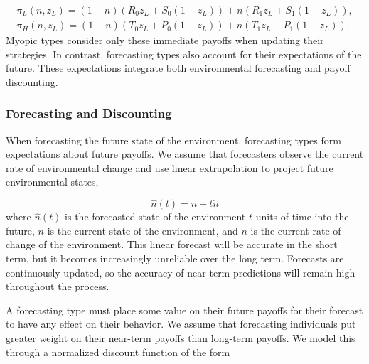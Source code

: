 \documentclass{article}
\begin{document}
\begin{align}
        \pi_L(n,z_L)= (1-n)(R_0 z_L +S_0 (1-z_L)) + n(R_1 z_L + S_1 (1-z_L)), \\
        \pi_H(n,z_L)= (1-n)(T_0 z_L +P_0 (1-z_L)) + n(T_1 z_L + P_1 (1-z_L)). 
\end{align}
Myopic types consider only these immediate payoffs when updating their strategies. In contrast, forecasting types also account for their expectations of the future. These expectations integrate both environmental forecasting and payoff discounting.

\subsubsection*{Forecasting and Discounting}
When forecasting the future state of the environment, forecasting types form expectations about future payoffs.  We assume that forecasters observe the current rate of environmental change and use linear extrapolation to project future environmental states, 

\begin{equation}
    \hat{n}(t)=n+t\dot{n}
\end{equation}
where $\hat{n}(t)$ is the forecasted state of the environment $t$ units of time into the future, $n$ is the current state of the environment, and $\dot{n}$ is the current rate of change of the environment. This linear forecast will be accurate in the short term, but it becomes increasingly unreliable over the long term.  Forecasts are continuously updated, so the accuracy of near-term predictions will remain high throughout the process.

A forecasting type must place some value on their future payoffs for their forecast to have any effect on their behavior. We assume that forecasting individuals put greater weight on their near-term payoffs than long-term payoffs. We model this through a normalized discount function of the form
\end{document}
